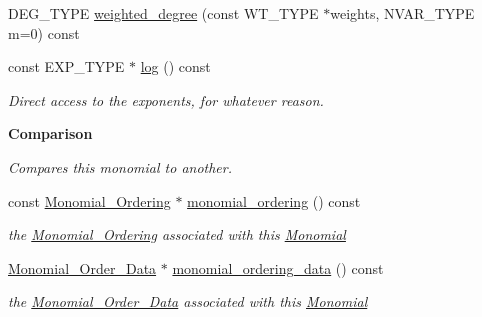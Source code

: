 \begin{Indent}
\begin{DoxyCompactItemize}
D\+E\+G\+\_\+\+T\+Y\+PE \hyperlink{group__polygroup_a5b19863967dc9801997d2d1058f312a3}{weighted\+\_\+degree} (const W\+T\+\_\+\+T\+Y\+PE $\ast$weights, N\+V\+A\+R\+\_\+\+T\+Y\+PE m=0) const
\item 
\mbox{\label{group__polygroup_a6b5a0acb65334373ed437045f9835a61}} 
const E\+X\+P\+\_\+\+T\+Y\+PE $\ast$ \hyperlink{group__polygroup_a6b5a0acb65334373ed437045f9835a61}{log} () const
\begin{DoxyCompactList}\small\item\em Direct access to the exponents, for whatever reason. \end{DoxyCompactList}\end{DoxyCompactItemize}
\end{Indent}
\begin{Indent}\textbf{ Comparison}\par
{\em Compares this monomial to another. }\begin{DoxyCompactItemize}
\item 
\mbox{\label{group__polygroup_abd2698ed3860ba7132c01685d8efe03c}} 
const \hyperlink{group__orderinggroup_class_monomial___ordering}{Monomial\+\_\+\+Ordering} $\ast$ \hyperlink{group__polygroup_abd2698ed3860ba7132c01685d8efe03c}{monomial\+\_\+ordering} () const
\begin{DoxyCompactList}\small\item\em the \hyperlink{group__orderinggroup_class_monomial___ordering}{Monomial\+\_\+\+Ordering} associated with this \hyperlink{group__polygroup_class_monomial}{Monomial} \end{DoxyCompactList}\item 
\mbox{\label{group__polygroup_ac8f4e8a87c0c7170780525beea5acfb3}} 
\hyperlink{group__orderinggroup_class_monomial___order___data}{Monomial\+\_\+\+Order\+\_\+\+Data} $\ast$ \hyperlink{group__polygroup_ac8f4e8a87c0c7170780525beea5acfb3}{monomial\+\_\+ordering\+\_\+data} () const
\begin{DoxyCompactList}\small\item\em the \hyperlink{group__orderinggroup_class_monomial___order___data}{Monomial\+\_\+\+Order\+\_\+\+Data} associated with this \hyperlink{group__polygroup_class_monomial}{Monomial} \end{DoxyCompactList}\item 
\mbox{\label{group__polygroup_a78be0a586fdca4bedaaaf8006a57d90e}} 

\end{DoxyCompactItemize}
\end{Indent}
